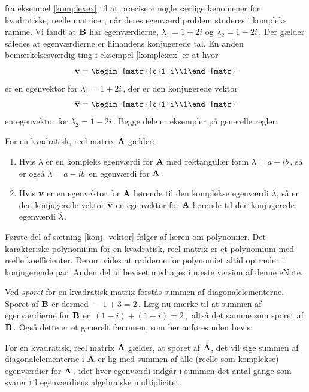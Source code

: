 fra eksempel \ref{komplexex} til at præcisere nogle særlige fænomener for kvadratiske, reelle matricer, når deres egenværdiproblem studeres i kompleks ramme.\bs
Vi fandt at $\mathbf{B}$ har egenværdierne, $\lambda_1=1+2i$ og $\lambda_2=1-2i\,.$ Der gælder således at egenværdierne er hinandens konjugerede tal. En anden bemærkelsesværdig ting i eksempel \ref{komplexex} er at hvor 
$$\mv=\begin{matr}{c}1-i\\1\end{matr}$$ er en egenvektor for $\lambda_1=1+2i\,$, der er den konjugerede vektor 
$$\overline{\mv}=\begin{matr}{c}1+i\\1\end{matr}$$ en egenvektor for $\lambda_2=1-2i\,.$ Begge dele er eksempler på generelle regler:

\begin{theorem}\label{konj_vektor}
For en kvadratisk, reel matrix $\mathbf{A}$ gælder:
\begin{enumerate}
\item Hvis $\lambda$ er en kompleks egenværdi for $\mathbf{A}$ med rektangulær form $\lambda=a+ib\,$, så er også $\overline{\lambda}=a-ib\,$ en egenværdi for $\mathbf{A}\,.$
\item Hvis $\mathbf{v}$ er en egenvektor for $\mathbf{A}$ hørende til den komplekse egenværdi $\lambda$, så er den konjugerede vektor $\overline{\mathbf{v}}$ en egenvektor for $\mathbf{A}$ hørende til den konjugerede egenværdi  $\overline{\lambda}\,.$ \end{enumerate}
\end{theorem}
\begin{bevis}
Første del af sætning \ref{konj_vektor} følger af læren om polynomier. Det karakteriske polynomium for en kvadratisk, reel matrix er et polynomium med reelle koefficienter. Derom vides at rødderne for polynomiet altid optræder i konjugerende par. Anden del af beviset medtages i næste version af denne eNote.  
\end{bevis}

Ved \textit{sporet} for en kvadratisk matrix forstås summen af diagonalelementerne. Sporet af $\mathbf{B}$ er dermed $\,-1+3=2\,$. Læg nu mærke til at summen af egenværdierne for $\mathbf{B}$ er $\,(1-i)+(1+i)=2\,,$ altså det samme som sporet af $\mathbf{B}\,.$ Også dette er et generelt fænomen, som her anføres uden bevis:

\begin{theorem}[Sporet]\label{sporet}
For en kvadratisk, reel matrix $\mathbf{A}$ gælder, at sporet af $\mathbf{A}$, det vil sige summen af dia\-gonalelementerne i $\mathbf{A}$ er lig med summen af alle (reelle som komplekse) egenværdier for $\mathbf{A}\,,$ idet hver egenværdi indgår i summen det antal gange som svarer til egenværdiens algebraiske multiplicitet.
\end{theorem}
 
